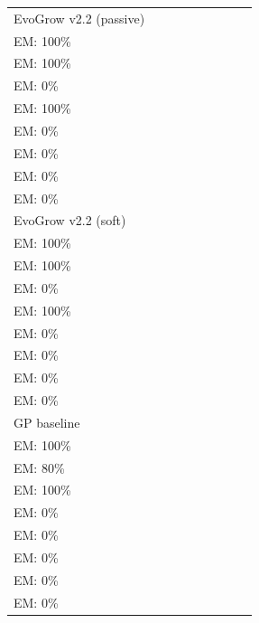 \begin{tabular}{lcccccccc}
EvoGrow v2.2 (passive) & \makecell{$6.3 \times 10^{-12} \pm 0$\\EM: 100\%} & \makecell{$3.2 \times 10^{-8} \pm 0$\\EM: 100\%} & \makecell{$4.3 \times 10^{-15} \pm 0$\\EM: 0\%} & \makecell{$5.4 \times 10^{-14} \pm 0$\\EM: 100\%} & \makecell{$3.8 \times 10^{-4} \pm 1.6 \times 10^{-4}$\\EM: 0\%} & \makecell{$7.0 \times 10^{-5} \pm 0$\\EM: 0\%} & \makecell{$1.2 \times 10^{-3} \pm 5.8 \times 10^{-4}$\\EM: 0\%} & \makecell{$1.2 \times 10^{-3} \pm 9.7 \times 10^{-4}$\\EM: 0\%} \\
EvoGrow v2.2 (soft) & \makecell{$6.3 \times 10^{-12} \pm 0$\\EM: 100\%} & \makecell{$3.2 \times 10^{-8} \pm 0$\\EM: 100\%} & \makecell{$4.3 \times 10^{-15} \pm 0$\\EM: 0\%} & \makecell{$5.4 \times 10^{-14} \pm 0$\\EM: 100\%} & \makecell{$2.5 \times 10^{-4} \pm 2.9 \times 10^{-5}$\\EM: 0\%} & \makecell{$7.0 \times 10^{-5} \pm 0$\\EM: 0\%} & \makecell{$9.4 \times 10^{-4} \pm 3.3 \times 10^{-4}$\\EM: 0\%} & \makecell{$9.6 \times 10^{-4} \pm 8.4 \times 10^{-4}$\\EM: 0\%} \\
GP baseline & \makecell{$6.3 \times 10^{-12} \pm 0$\\EM: 100\%} & \makecell{$3.0 \times 10^{-8} \pm 5.3 \times 10^{-9}$\\EM: 80\%} & \makecell{$4.6 \times 10^{-15} \pm 0$\\EM: 100\%} & \makecell{$4.5 \times 10^{-3} \pm 1.0 \times 10^{-2}$\\EM: 0\%} & \makecell{$3.0 \times 10^{-3} \pm 1.2 \times 10^{-3}$\\EM: 0\%} & \makecell{$3.1 \times 10^{-1} \pm 3.7 \times 10^{-1}$\\EM: 0\%} & \makecell{$9.2 \times 10^{-1} \pm 3.1 \times 10^{-1}$\\EM: 0\%} & \makecell{$1.3 \times 10^{-3} \pm 3.3 \times 10^{-4}$\\EM: 0\%} \\
\bottomrule
\end{tabular}

